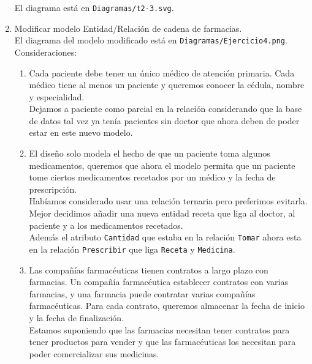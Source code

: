 \documentclass[12pt,a4paper]{article}
\begin{document}
\begin{enumerate}
El diagrama  está en \texttt{Diagramas/t2-3.svg}.
	
	\item Modificar modelo Entidad/Relación de cadena de farmacias.\\
		El diagrama del modelo modificado está en \texttt{Diagramas/Ejercicio4.png}.\\

		Consideraciones:\\
		\begin{enumerate}
			\item Cada paciente debe tener un único médico de atención primaria. Cada médico tiene al menos un paciente
				y queremos conocer la cédula, nombre y especialidad.\\

				Dejamos a paciente como parcial en la relación considerando que
				la base de datos tal vez ya tenía pacientes sin doctor que ahora
				deben de poder estar en este nuevo modelo.\\

			\item El diseño solo modela el hecho de que un paciente toma algunos medicamentos, queremos que ahora el modelo
				permita que un paciente tome ciertos medicamentos recetados por un médico y la fecha de prescripción.\\

				Habíamos considerado usar una relación ternaria pero preferimos evitarla.
				Mejor decidimos añadir una nueva entidad receta que liga al doctor, al paciente y a los medicamentos recetados.\\

				Además el atributo \texttt{Cantidad} que estaba en la relación \texttt{Tomar} ahora esta
				en la relación \texttt{Prescribir} que liga \texttt{Receta} y \texttt{Medicina}.\\

			\item Las compañías farmacéuticas tienen contratos a largo plazo con farmacias. Un compañía farmacéutica establecer
				contratos con varias farmacias, y una farmacia puede contratar varias compañías farmacéuticas. Para cada
				contrato, queremos almacenar la fecha de inicio y la fecha de finalización.\\

				Estamos suponiendo que las farmacias necesitan tener contratos para tener productos para vender y
				que las farmacéuticas los necesitan para poder comercializar sus medicinas.\\

		\end{enumerate}
\end{enumerate}
\end{document}

